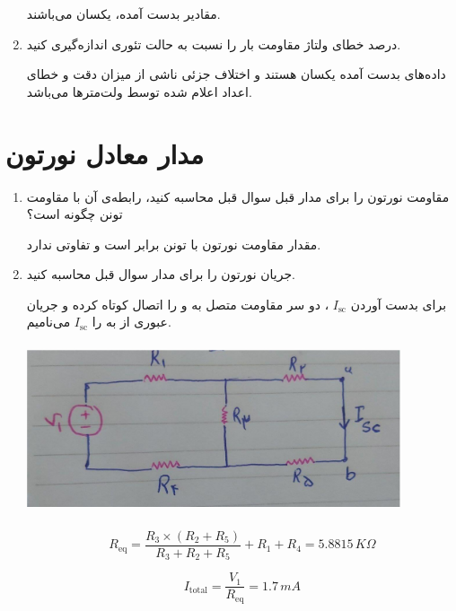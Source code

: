 \documentclass{article}
\begin{document}
\begin{enumerate}[label=\Alph*), align=left, leftmargin=*]
			مقادیر بدست‌ آمده، یکسان می‌باشند.
			
			\item 
			درصد خطای ولتاژ‌ مقاومت بار را نسبت به حالت تئوری اندازه‌گیری کنید.
			
			داده‌‌های بدست‌ آمده یکسان هستند و اختلاف جزئی ناشی از میزان دقت و خطای اعداد اعلام شده توسط ولت‌متر‌ها می‌باشد.
		\end{enumerate}
	
	\section{مدار معادل نورتون}
		\begin{enumerate}[label=\Alph*), align=left, leftmargin=*]
			\item 
			مقاومت نورتون را برای مدار قبل سوال قبل محاسبه کنید، رابطه‌ی آن با مقاومت تونن چگونه‌ است؟
			
			مقدار مقاومت نورتون با تونن برابر است و تفاوتی ندارد.
			
			\item 
			جریان نورتون را برای مدار سوال قبل محاسبه کنید.
			
			برای بدست آوردن 
			$I_{\text{sc}}$
			، دو سر مقاومت متصل به 
			و
			 را اتصال کوتاه کرده و جریان عبوری از 
			 به
			 را 
			 $I_{\text{sc}}$
			 می‌نامیم.
			 
			 \begin{center}
			 	\includegraphics[width=11cm, height=5cm]{./images/R3.1}
			 \end{center}
			 
			 \begin{equation*}
			 	R_{\text{eq}} = \frac{R_3 \times (R_2 + R_5)}{R_3 + R_2 + R_5} + R_1 + R_4 = 5.8815 \, K\Omega 
			 \end{equation*}
		 
		 	\begin{equation*}
		 		I_{\text{total}} = \frac{V_1}{R_{\text{eq}}} = 1.7 \, mA
		 	\end{equation*}
	 	

\end{enumerate}
\end{document}
